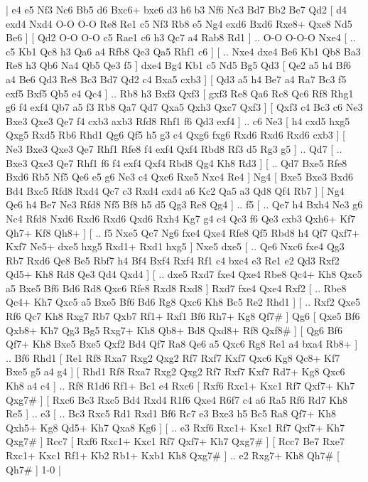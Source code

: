 \makegametitle 
|   e4   e5    Nf3   Nc6    Bb5   d6    Bxc6+   bxc6    d3   h6    b3   Nf6    Nc3   Bd7    Bb2   Be7    Qd2 [  d4 exd4  Nxd4 O-O  O-O Re8  Re1 c5  Nf3 Rb8  e5 Ng4  exd6 Bxd6  Rxe8+ Qxe8  Nd5 Be6   ]  [  Qd2 O-O  O-O c5  Rae1 c6  h3 Qc7  a4 Rab8  Rd1   ] .. O-O    O-O-O   Nxe4 [ .. c5  Kb1 Qc8  h3 Qa6  a4 Rfb8  Qe3 Qa5  Rhf1 c6   ]  [ .. Nxe4  dxe4 Be6  Kb1 Qb8  Ba3 Re8  h3 Qb6  Na4 Qb5  Qe3 f5   ]  dxe4   Bg4    Kb1   c5    Nd5   Bg5    Qd3 [  Qe2 a5  h4 Bf6  a4 Be6  Qd3 Re8  Bc3 Bd7  Qd2 c4  Bxa5 cxb3   ]  [  Qd3 a5  h4 Be7  a4 Ra7  Bc3 f5  exf5 Bxf5  Qb5 e4  Qc4   ] .. Rb8    h3   Bxf3    Qxf3 [  gxf3 Re8  Qa6 Rc8  Qc6 Rf8  Rhg1 g6  f4 exf4  Qb7 a5  f3 Rb8  Qa7 Qd7  Qxa5 Qxh3  Qxc7 Qxf3   ]  [  Qxf3 c4  Bc3 c6  Ne3 Bxe3  Qxe3 Qe7  f4 cxb3  axb3 Rfd8  Rhf1 f6  Qd3 exf4   ] .. c6    Ne3 [  h4 cxd5  hxg5 Qxg5  Rxd5 Rb6  Rhd1 Qg6  Qf5 h5  g3 c4  Qxg6 fxg6  Rxd6 Rxd6  Rxd6 cxb3   ]  [  Ne3 Bxe3  Qxe3 Qe7  Rhf1 Rfe8  f4 exf4  Qxf4 Rbd8  Rf3 d5  Rg3 g5   ] .. Qd7 [ .. Bxe3  Qxe3 Qe7  Rhf1 f6  f4 exf4  Qxf4 Rbd8  Qg4 Kh8  Rd3   ]  [ .. Qd7  Bxe5 Rfe8  Bxd6 Rb5  Nf5 Qe6  e5 g6  Ne3 c4  Qxc6 Rxe5  Nxc4 Re4   ]  Ng4 [  Bxe5 Bxe3  Bxd6 Bd4  Bxc5 Rfd8  Rxd4 Qc7  c3 Rxd4  cxd4 a6  Kc2 Qa5  a3 Qd8  Qf4 Rb7   ]  [  Ng4 Qe6  h4 Be7  Ne3 Rfd8  Nf5 Bf8  h5 d5  Qg3 Re8  Qg4   ] .. f5 [ .. Qe7  h4 Bxh4  Ne3 g6  Nc4 Rfd8  Nxd6 Rxd6  Rxd6 Qxd6  Rxh4 Kg7  g4 c4  Qc3 f6  Qe3 cxb3  Qxh6+ Kf7  Qh7+ Kf8  Qh8+   ]  [ .. f5  Nxe5 Qc7  Ng6 fxe4  Qxe4 Rfe8  Qf5 Rbd8  h4 Qf7  Qxf7+ Kxf7  Ne5+ dxe5  hxg5 Rxd1+  Rxd1 hxg5   ]  Nxe5   dxe5 [ .. Qe6  Nxc6 fxe4  Qg3 Rb7  Rxd6 Qe8  Be5 Rbf7  h4 Bf4  Bxf4 Rxf4  Rf1 c4  bxc4 e3  Re1 e2  Qd3 Rxf2  Qd5+ Kh8  Rd8 Qe3  Qd4 Qxd4   ]  [ .. dxe5  Rxd7 fxe4  Qxe4 Rbe8  Qc4+ Kh8  Qxc5 a5  Bxe5 Bf6  Bd6 Rd8  Qxc6 Rfe8  Rxd8 Rxd8   ]  Rxd7   fxe4    Qxe4   Rxf2 [ .. Rbe8  Qc4+ Kh7  Qxc5 a5  Bxe5 Bf6  Bd6 Rg8  Qxc6 Kh8  Bc5 Re2  Rhd1   ]  [ .. Rxf2  Qxe5 Rf6  Qc7 Kh8  Rxg7 Rb7  Qxb7 Rf1+  Rxf1 Bf6  Rh7+ Kg8  Qf7#   ]  Qg6 [  Qxe5 Bf6  Qxb8+ Kh7  Qg3 Bg5  Rxg7+ Kh8  Qb8+ Bd8  Qxd8+ Rf8  Qxf8#   ]  [  Qg6 Bf6  Qf7+ Kh8  Bxe5 Bxe5  Qxf2 Bd4  Qf7 Ra8  Qe6 a5  Qxc6 Rg8  Re1 a4  bxa4 Rb8+   ] .. Bf6    Rhd1 [  Re1 Rf8  Rxa7 Rxg2  Qxg2 Rf7  Rxf7 Kxf7  Qxc6 Kg8  Qc8+ Kf7  Bxe5 g5  a4 g4   ]  [  Rhd1 Rf8  Rxa7 Rxg2  Qxg2 Rf7  Rxf7 Kxf7  Rd7+ Kg8  Qxc6 Kh8  a4 c4   ] .. Rf8    R1d6   Rf1+    Bc1   e4    Rxc6 [  Rxf6 Rxc1+  Kxc1 Rf7  Qxf7+ Kh7  Qxg7#   ]  [  Rxc6 Bc3  Rxc5 Bd4  Rxd4 R1f6  Qxe4 R6f7  c4 a6  Ra5 Rf6  Rd7 Kh8  Re5   ] .. e3 [ .. Bc3  Rxc5 Rd1  Rxd1 Bf6  Rc7 e3  Bxe3 h5  Bc5 Ra8  Qf7+ Kh8  Qxh5+ Kg8  Qd5+ Kh7  Qxa8 Kg6   ]  [ .. e3  Rxf6 Rxc1+  Kxc1 Rf7  Qxf7+ Kh7  Qxg7#   ]  Rcc7 [  Rxf6 Rxc1+  Kxc1 Rf7  Qxf7+ Kh7  Qxg7#   ]  [  Rcc7 Be7  Rxe7 Rxc1+  Kxc1 Rf1+  Kb2 Rb1+  Kxb1 Kh8  Qxg7#   ] .. e2    Rxg7+   Kh8    Qh7#    [  Qh7#   ] 1-0  |
